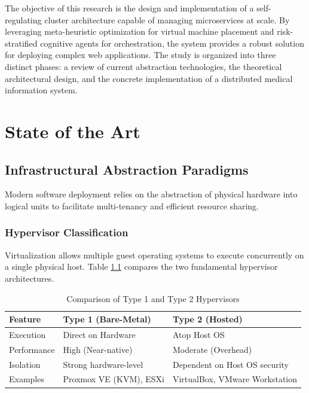 \documentclass[12pt,a4paper]{report}
\begin{document}
The objective of this research is the design and implementation of a self-regulating cluster architecture capable of managing microservices at scale. By leveraging meta-heuristic optimization for virtual machine placement and risk-stratified cognitive agents for orchestration, the system provides a robust solution for deploying complex web applications. The study is organized into three distinct phases: a review of current abstraction technologies, the theoretical architectural design, and the concrete implementation of a distributed medical information system.

\chapter{State of the Art}

\section{Infrastructural Abstraction Paradigms}

Modern software deployment relies on the abstraction of physical hardware into logical units to facilitate multi-tenancy and efficient resource sharing.

\subsection{Hypervisor Classification}
Virtualization allows multiple guest operating systems to execute concurrently on a single physical host. Table \ref{tab:hypervisors} compares the two fundamental hypervisor architectures.

\begin{table}[htbp]
\centering
\caption{Comparison of Type 1 and Type 2 Hypervisors}
\label{tab:hypervisors}
\begin{tabular}{@{}lll@{}}
\toprule
\textbf{Feature} & \textbf{Type 1 (Bare-Metal)} & \textbf{Type 2 (Hosted)} \\ \midrule
Execution & Direct on Hardware & Atop Host OS \\
Performance & High (Near-native) & Moderate (Overhead) \\
Isolation & Strong hardware-level & Dependent on Host OS security \\
Examples & Proxmox VE (KVM), ESXi & VirtualBox, VMware Workstation \\ \bottomrule
\end{tabular}
\end{table}
\end{document}
